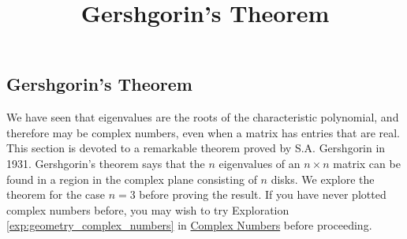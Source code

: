\documentclass{ximera}
\title{Gershgorin's Theorem} \license{CC BY-NC-SA 4.0}
\begin{document}
\begin{abstract}
\end{abstract}
\maketitle

\begin{onlineOnly}
\section*{Gershgorin's Theorem}
\end{onlineOnly}

We have seen that eigenvalues are the roots of the characteristic polynomial, and therefore may be complex numbers, even when a matrix has entries that are real.  This section is devoted to a remarkable theorem proved by S.A. Gershgorin in 1931. Gershgorin's theorem says that the $n$ eigenvalues of an $n \times n$ matrix can be found in a region in the complex plane consisting of $n$ disks.  We explore the theorem for the case $n=3$ before proving the result.  If you have never plotted complex numbers before, you may wish to try Exploration \ref{exp:geometry_complex_numbers} in \href{https://ximera.osu.edu/oerlinalg/LinearAlgebra/APX-0020/main}{Complex Numbers} before proceeding.
\end{document}
